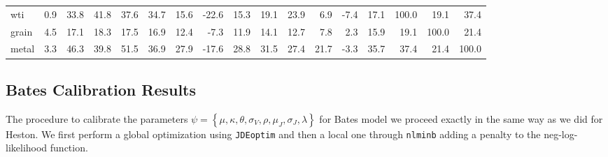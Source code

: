 \begin{table}
{\begin{tabular}{lrrrrrrrrrrrrrrrr}
    wti   & \cellcolor[rgb]{ .988,  .984,  .996}0.9 & \cellcolor[rgb]{ .984,  .796,  .804}33.8 & \cellcolor[rgb]{ .984,  .749,  .761}41.8 & \cellcolor[rgb]{ .984,  .773,  .784}37.6 & \cellcolor[rgb]{ .984,  .792,  .8}34.7 & \cellcolor[rgb]{ .988,  .902,  .91}15.6 & \cellcolor[rgb]{ .843,  .886,  .949}-22.6 & \cellcolor[rgb]{ .988,  .902,  .914}15.3 & \cellcolor[rgb]{ .988,  .878,  .89}19.1 & \cellcolor[rgb]{ .988,  .851,  .863}23.9 & \cellcolor[rgb]{ .988,  .949,  .961}6.9 & \cellcolor[rgb]{ .937,  .953,  .98}-7.4 & \cellcolor[rgb]{ .988,  .89,  .902}17.1 & \cellcolor[rgb]{ .973,  .412,  .42}100.0 & \cellcolor[rgb]{ .988,  .878,  .89}19.1 & \cellcolor[rgb]{ .984,  .773,  .784}37.4 \\
    grain & \cellcolor[rgb]{ .988,  .965,  .976}4.5 & \cellcolor[rgb]{ .988,  .89,  .902}17.1 & \cellcolor[rgb]{ .988,  .886,  .894}18.3 & \cellcolor[rgb]{ .988,  .89,  .902}17.5 & \cellcolor[rgb]{ .988,  .894,  .906}16.9 & \cellcolor[rgb]{ .988,  .918,  .929}12.4 & \cellcolor[rgb]{ .941,  .953,  .98}-7.3 & \cellcolor[rgb]{ .988,  .922,  .933}11.9 & \cellcolor[rgb]{ .988,  .91,  .922}14.1 & \cellcolor[rgb]{ .988,  .918,  .929}12.7 & \cellcolor[rgb]{ .988,  .945,  .957}7.8 & \cellcolor[rgb]{ .988,  .976,  .988}2.3 & \cellcolor[rgb]{ .988,  .898,  .91}15.9 & \cellcolor[rgb]{ .988,  .878,  .89}19.1 & \cellcolor[rgb]{ .973,  .412,  .42}100.0 & \cellcolor[rgb]{ .988,  .867,  .878}21.4 \\
    metal & \cellcolor[rgb]{ .988,  .973,  .984}3.3 & \cellcolor[rgb]{ .984,  .725,  .733}46.3 & \cellcolor[rgb]{ .984,  .761,  .773}39.8 & \cellcolor[rgb]{ .98,  .694,  .702}51.5 & \cellcolor[rgb]{ .984,  .776,  .788}36.9 & \cellcolor[rgb]{ .984,  .831,  .839}27.9 & \cellcolor[rgb]{ .875,  .906,  .957}-17.6 & \cellcolor[rgb]{ .984,  .824,  .835}28.8 & \cellcolor[rgb]{ .984,  .808,  .82}31.5 & \cellcolor[rgb]{ .984,  .831,  .843}27.4 & \cellcolor[rgb]{ .988,  .867,  .875}21.7 & \cellcolor[rgb]{ .965,  .973,  .992}-3.3 & \cellcolor[rgb]{ .984,  .784,  .796}35.7 & \cellcolor[rgb]{ .984,  .773,  .784}37.4 & \cellcolor[rgb]{ .988,  .867,  .878}21.4 & \cellcolor[rgb]{ .973,  .412,  .42}100.0 \\
    \end{tabular}%
}
  \label{tab:heston_corr}%
\end{table}%



\subsection{Bates Calibration Results}
The procedure to calibrate the parameters $\psi =  \left\{ \mu, \kappa, \theta, \sigma_V, \rho, \mu_J, \sigma_J, \lambda \right\}$ for Bates model we proceed exactly in the same way as we did for Heston. We first perform a global optimization using \texttt{JDEoptim} and then a local one through \texttt{nlminb} adding a penalty to the neg-log-likelihood function. 

